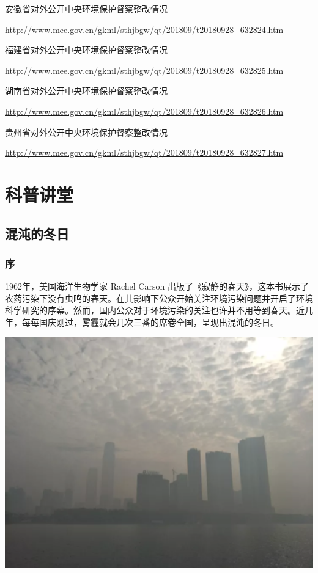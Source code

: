\documentclass[]{book}
\begin{document}
安徽省对外公开中央环境保护督察整改情况

\url{http://www.mee.gov.cn/gkml/sthjbgw/qt/201809/t20180928_632824.htm}

福建省对外公开中央环境保护督察整改情况

\url{http://www.mee.gov.cn/gkml/sthjbgw/qt/201809/t20180928_632825.htm}

湖南省对外公开中央环境保护督察整改情况

\url{http://www.mee.gov.cn/gkml/sthjbgw/qt/201809/t20180928_632826.htm}

贵州省对外公开中央环境保护督察整改情况

\url{http://www.mee.gov.cn/gkml/sthjbgw/qt/201809/t20180928_632827.htm}

\chapter{科普讲堂}

\section{混沌的冬日}

\subsection{序}

1962年，美国海洋生物学家 Rachel Carson
出版了《寂静的春天》，这本书展示了农药污染下没有虫鸣的春天。在其影响下公众开始关注环境污染问题并开启了环境科学研究的序幕。然而，国内公众对于环境污染的关注也许并不用等到春天。近几年，每每国庆刚过，雾霾就会几次三番的席卷全国，呈现出混沌的冬日。

\includegraphics[width=6.67in]{images/cw1}
\end{document}
